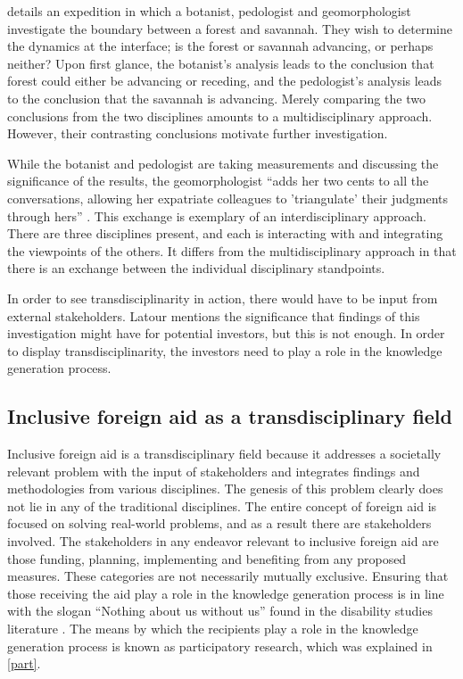 \documentclass[a4paper]{article}
\begin{document}
\cite{latour1999circulating} details an expedition in which a botanist,
pedologist and geomorphologist investigate the boundary between a forest and
savannah. They wish to determine the dynamics at the interface; is the forest
or savannah advancing, or perhaps neither? Upon first glance, the botanist's
analysis leads to the conclusion that forest could either be advancing or
receding, and the pedologist's analysis leads to the conclusion that the
savannah is advancing. Merely comparing the two conclusions from the two
disciplines amounts to a multidisciplinary approach. However, their
contrasting conclusions motivate further investigation.

While the botanist and pedologist are taking measurements and discussing the
significance of the results, the geomorphologist ``adds her two cents to all
the conversations, allowing her expatriate colleagues to 'triangulate' their
judgments through hers'' \citep{latour1999circulating}. This exchange is
exemplary of an interdisciplinary approach. There are three disciplines
present, and each is interacting with and integrating the viewpoints of the
others. It differs from the multidisciplinary approach in that there is an
exchange between the individual disciplinary standpoints.

In order to see transdisciplinarity in action, there would have to be input
from external stakeholders. Latour mentions the significance that findings of
this investigation might have for potential investors, but this is not enough.
In order to display transdisciplinarity, the investors need to play a role in
the knowledge generation process.

\subsection{Inclusive foreign aid as a transdisciplinary field}

Inclusive foreign aid is a transdisciplinary field because it addresses a
societally relevant problem with the input of stakeholders and integrates
findings and methodologies from various disciplines. The genesis of this
problem clearly does not lie in any of the traditional disciplines. The entire
concept of foreign aid is focused on solving real-world problems, and as a
result there are stakeholders involved. The stakeholders in any endeavor
relevant to inclusive foreign aid are those funding, planning, implementing
and benefiting from any proposed measures. These categories are not
necessarily mutually exclusive. Ensuring that those receiving the aid play a
role in the knowledge generation process is in line with the slogan ``Nothing
about us without us'' found in the disability studies literature
\citep{pfeiffer2000disability}. The means by which the recipients play a role
in the knowledge generation process is known as participatory research, which
was explained in \autoref{part}.
\end{document}
